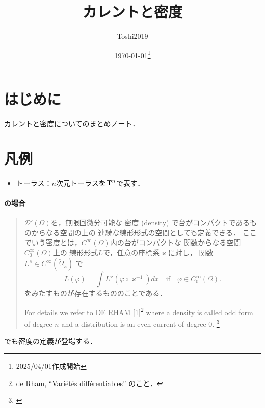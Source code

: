 \title{カレントと密度}
\author{Toshi2019}
\date{\today\footnote{2025/04/01作成開始}}

\maketitle
\tableofcontents
\section*{はじめに}
カレントと密度についてのまとめノート．
\section*{凡例}
\begin{itemize}
    \item トーラス：\(n\)次元トーラスを\(\mathbf{T}^n\)で表す．
\end{itemize}

\paragraph{\cite{Hor63,Hor89}の場合}

\begin{quotation}
    \(\mathscr{D}'(\varOmega)\)を，無限回微分可能な
    密度 (density) で台がコンパクトであるものからなる空間の上の
    連続な線形形式の空間としても定義できる．
    ここでいう密度とは，\(C^\infty(\varOmega)\)内の台がコンパクトな
    関数からなる空間\(C_0^\infty(\varOmega)\)上の
    線形形式\(L\)で，任意の座標系\(\varkappa\)に対し，
    関数\(L^{\varkappa}\in C^\infty(\tilde{\varOmega}_\varkappa)\)
    で    \[
        L(\varphi)= \int L^\varkappa(\varphi\circ\varkappa^{-1})dx
        \quad \text{if} \quad \varphi\in C_0^\infty(\varOmega).
    \]
    をみたすものが存在するもののことである．

    For details we refer to DE RHAM [1]\footnote{de Rham, ``Vari\'et\'es diff\'erentiables'' のこと．} 
    where a density is called odd form of degree \(n\) 
    and a distribution is an even current of degree 0.
    \footnote{\cite[p.28]{Hor63}}
\end{quotation}
\cite[p.145]{Hor89}でも密度の定義が登場する．

